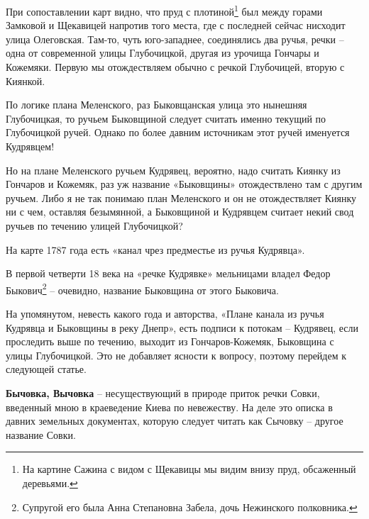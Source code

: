 При сопоставлении карт видно, что пруд с плотиной\footnote{На картине Сажина с видом с Щекавицы мы видим внизу пруд, обсаженный деревьями.} был между горами Замковой и Щекавицей напротив того места, где с последней сейчас нисходит улица Олеговская. Там-то, чуть юго-западнее, соединялись два ручья, речки – одна от современной улицы Глубочицкой, другая из урочища Гончары и Кожемяки. Первую мы отождествляем обычно с речкой Глубочицей, вторую с Киянкой.

По логике плана Меленского, раз Быковщанская улица это нынешняя Глубочицкая, то ручьем Быковщиной следует считать именно текущий по Глубочицкой ручей. Однако по более давним источникам этот ручей именуется Кудрявцем!

Но на плане Меленского ручьем Кудрявец, вероятно, надо считать Киянку из Гончаров и Кожемяк, раз уж название «Быковщины» отождествлено там с другим ручьем. Либо я не так понимаю план Меленского и он не отождествляет Киянку ни с чем, оставляя безымянной, а Быковщиной и Кудрявцем считает некий свод ручьев по течению улицей Глубочицкой?

На карте 1787 года есть «канал чрез предместье из ручья Кудрявца».

В первой четверти 18 века на «речке Кудрявке» мельницами владел Федор Быкович\footnote{Супругой его была Анна Степановна Забела, дочь Нежинского полковника.} – очевидно, название Быковщина от этого Быковича.

На упомянутом, невесть какого года и авторства, «Плане канала из ручья Кудрявца и Быковщины в реку Днепр», есть подписи к потокам – Кудрявец, если проследить выше по течению, выходит из Гончаров-Кожемяк, Быковщина с улицы Глубочицкой. Это не добавляет ясности к вопросу, поэтому перейдем к следующей статье.\\

\medskip

\textbf{Бычовка, Вычовка} – несуществующий в природе приток речки Совки, введенный мною в краеведение Киева по невежеству. На деле это описка в давних земельных документах, которую следует читать как Сычовку – другое название Совки.
